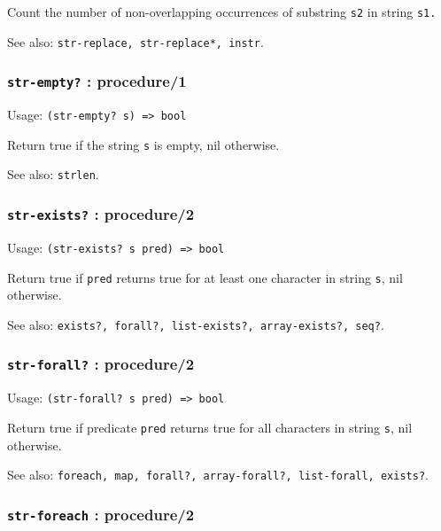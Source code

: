 \documentclass[
]{article}
\newcommand{\passthrough}[1]{#1}
\begin{document}
Count the number of non-overlapping occurrences of substring
\passthrough{\lstinline!s2!} in string \passthrough{\lstinline!s1.!}

See also: \passthrough{\lstinline!str-replace, str-replace*, instr!}.

\hypertarget{str-empty-procedure1}{%
\subsubsection{\texorpdfstring{\texttt{str-empty?} :
procedure/1}{str-empty? : procedure/1}}\label{str-empty-procedure1}}

Usage: \passthrough{\lstinline!(str-empty? s) => bool!}

Return true if the string \passthrough{\lstinline!s!} is empty, nil
otherwise.

See also: \passthrough{\lstinline!strlen!}.

\hypertarget{str-exists-procedure2}{%
\subsubsection{\texorpdfstring{\texttt{str-exists?} :
procedure/2}{str-exists? : procedure/2}}\label{str-exists-procedure2}}

Usage: \passthrough{\lstinline!(str-exists? s pred) => bool!}

Return true if \passthrough{\lstinline!pred!} returns true for at least
one character in string \passthrough{\lstinline!s!}, nil otherwise.

See also:
\passthrough{\lstinline!exists?, forall?, list-exists?, array-exists?, seq?!}.

\hypertarget{str-forall-procedure2}{%
\subsubsection{\texorpdfstring{\texttt{str-forall?} :
procedure/2}{str-forall? : procedure/2}}\label{str-forall-procedure2}}

Usage: \passthrough{\lstinline!(str-forall? s pred) => bool!}

Return true if predicate \passthrough{\lstinline!pred!} returns true for
all characters in string \passthrough{\lstinline!s!}, nil otherwise.

See also:
\passthrough{\lstinline!foreach, map, forall?, array-forall?, list-forall, exists?!}.

\hypertarget{str-foreach-procedure2}{%
\subsubsection{\texorpdfstring{\texttt{str-foreach} :
procedure/2}{str-foreach : procedure/2}}\label{str-foreach-procedure2}}
\end{document}
